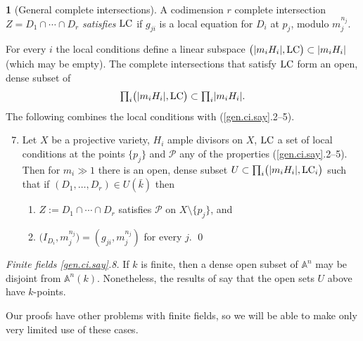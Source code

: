 \documentclass{amsart}
\theoremstyle{definition}
\newtheorem{say}[thm]{}
\theoremstyle{remark}
\renewcommand{\a}[0]{{\mathbb A}}
\newcommand{\tprod}[0]{\textstyle{\prod}}
\begin{document}
\begin{say}[General  complete intersections]
A codimension $r$ complete intersection  $Z=D_1\cap\cdots\cap D_r$  {\it satisfies} ${\rm LC}$ if  $g_{ji}$ is a  local equation for $D_i$ at $p_j$, modulo  $m_j^{n_j}$.

For every $i$ the local conditions define a linear subspace
$\bigl(|m_iH_i|,{\rm LC}\bigr) \subset |m_iH_i|$  (which may be empty).
The complete intersections that satisfy ${\rm LC}$ form an open, dense subset of
$$
\tprod_i \bigl(|m_iH_i|,{\rm LC}\bigr) \subset \tprod_i |m_iH_i|.
$$
The following combines the local conditions with (\ref{gen.ci.say}.2--5).
\begin{enumerate}\setcounter{enumi}{6}
\item Let $X$ be a  projective  variety,  $H_i$ ample divisors on $X$,
 ${\rm LC}$ a set of local conditions at the points $\{p_j\}$ 
and   ${\mathcal P}$  any of the properties (\ref{gen.ci.say}.2--5). 
Then for $m_i\gg 1$ there is an open, dense subset
$U\subset \prod_i \bigl(|m_iH_i|,{\rm LC}_i\bigr)$ such that if 
$(D_1,\dots, D_r)\in U(\bar k)$  then
\begin{enumerate}
\item[(a)]  $Z:= D_1\cap\cdots\cap D_r$ satisfies ${\mathcal P}$ on $X\setminus\{p_j\}$, and 
\item[(b)]  $\bigl(I_{D_i}, m_j^{n_j}\bigr)= (g_{ji}, m_j^{n_j})$ for every $j$. \qed
\end{enumerate}
\end{enumerate}
\medskip

{\it Finite fields \ref{gen.ci.say}.8.}  If $k$ is finite, then a dense open subset of $\a^n$ may be disjoint from $\a^n(k)$. Nonetheless, the results of 
\cite{MR2385639, cha-poo}  
say that the open sets $U$ above have $k$-points. 

Our proofs have other problems with finite fields, so we will be able to make only very limited use of these cases.
\end{say}
\end{document}
